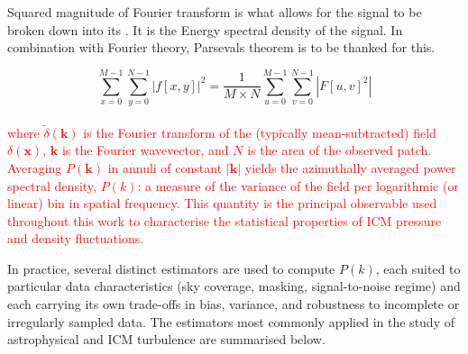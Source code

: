 Squared magnitude of Fourier transform is what allows for the signal to be broken down into its . It is the Energy spectral density of the signal. In combination with Fourier theory, Parsevals theorem is to be thanked for this.

\begin{equation}
	\sum_{x=0}^{M-1} \sum_{y=0}^{N-1} |f[x,y]|^2 = \frac{1}{M \times N} \sum_{u=0}^{M-1} \sum_{v=0}^{N-1} |F[u,v]^2|
	\label{eq:Parsevals_Theorem}
\end{equation}
\\
\textcolor{red}{where $\widetilde{\delta}(\mathbf{k})$ is the Fourier transform of the (typically mean-subtracted) field $\delta(\mathbf{x})$, $\mathbf{k}$ is the Fourier wavevector, and $N$ is the area of the observed patch. Averaging $P(\mathbf{k})$ in annuli of constant $|\mathbf{k}|$ yields the azimuthally averaged power spectral density, $P(k)$: a measure of the variance of the field per logarithmic (or linear) bin in spatial frequency. This quantity is the principal observable used throughout this work to characterise the statistical properties of ICM pressure and density fluctuations.}

In practice, several distinct estimators are used to compute $P(k)$, each suited to particular data characteristics (sky coverage, masking, signal-to-noise regime) and each carrying its own trade-offs in bias, variance, and robustness to incomplete or irregularly sampled data. The estimators most commonly applied in the study of astrophysical and ICM turbulence are summarised below.


